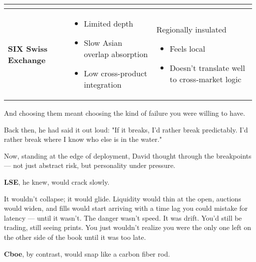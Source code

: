 \begin{table}[H]
\begin{tabularx}{\textwidth}{|l|X|X|}
\begin{itemize}
            \end{itemize}
        \\
    \hline
    \textbf{SIX Swiss Exchange} 
        & 
            \begin{itemize}
                \item Limited depth
                \item Slow Asian overlap absorption
                \item Low cross-product integration
            \end{itemize}
        &   
            Regionally insulated 
            \begin{itemize}
                \item Feels local
                \item Doesn’t translate well to cross-market logic
            \end{itemize} 
        \\
    \hline
    \end{tabularx}
\end{table}


\medskip




And choosing them meant choosing the kind of failure you were willing to have.

Back then, he had said it out loud:
"If it breaks, I’d rather break predictably. I’d rather break where I know who else is in the water."

Now, standing at the edge of deployment, David thought through the breakpoints — not just abstract risk, but personality under pressure.

\textbf{LSE}, he knew, would crack slowly.

\begin{tcolorbox}[
    enhanced,
    sharp corners,
    boxrule=0pt,
    colback=gray!3,
    borderline west={2pt}{0pt}{gray!60}, %
    left=10pt,
    right=10pt,
    top=6pt,
    bottom=6pt,
    width=\linewidth,
    fontupper=\small\itshape
  ]
    It wouldn’t collapse; it would glide. Liquidity would thin at the open, auctions would widen, and fills would start arriving with a time lag you could mistake for latency — until it wasn’t.
    The danger wasn’t speed. It was drift. You’d still be trading, still seeing prints. You just wouldn’t realize you were the only one left on the other side of the book until it was too late.
\end{tcolorbox}

\textbf{Cboe}, by contrast, would snap like a carbon fiber rod.

